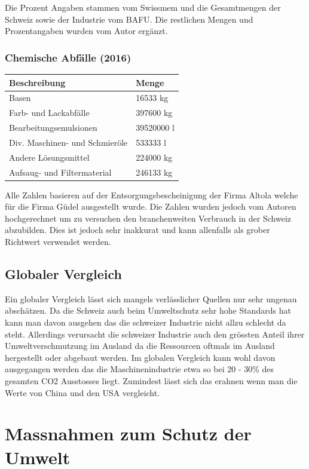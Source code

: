 Die Prozent Angaben stammen vom Swissmem und die Gesamtmengen der
Schweiz sowie der Industrie vom BAFU. Die restlichen Mengen und
Prozentangaben wurden vom Autor ergänzt.

\subsubsection{Chemische Abfälle (2016)}
\label{sec:org2becb56}

\begin{center}
\begin{tabular}{ll}
Beschreibung & Menge\\
\hline
Basen & 16533 kg\\
Farb- und Lackabfälle & 397600 kg\\
Bearbeitungsemulsionen & 39520000 l\\
Div. Maschinen- und Schmieröle & 533333 l\\
Andere Lösungsmittel & 224000 kg\\
Aufsaug- und Filtermaterial & 246133 kg\\
\end{tabular}

\end{center}

Alle Zahlen basieren auf der Entsorgungsbescheinigung \cite{ref10} der
Firma Altola welche für die Firma Güdel ausgestellt wurde. Die Zahlen
wurden jedoch vom Autoren hochgerechnet um zu versuchen den
branchenweiten Verbrauch in der Schweiz abzubilden. Dies ist jedoch
sehr inakkurat und kann allenfalls als grober Richtwert verwendet werden.

\subsection{Globaler Vergleich}
\label{sec:orgc35480b}
Ein globaler Vergleich lässt sich mangels verlässlicher Quellen nur
sehr ungenau abschätzen. Da die Schweiz auch beim Umweltschutz sehr
hohe Standards hat kann man davon ausgehen das die schweizer Industrie
nicht allzu schlecht da steht. Allerdings verursacht die schweizer
Industrie auch den grössten Anteil ihrer Umweltverschmutzung im
Ausland da die Ressourcen oftmals im Ausland hergestellt oder abgebaut
werden. Im globalen Vergleich kann wohl davon ausgegangen werden das
die Maschinenindustrie etwa so bei 20 - 30\% des gesamten CO2
Ausstosses liegt.  Zumindest lässt sich das erahnen wenn man die Werte
von China \cite{ref12} und den USA \cite{ref11} vergleicht.
\newpage
\section{Massnahmen zum Schutz der Umwelt}
\label{sec:org251d92e}
